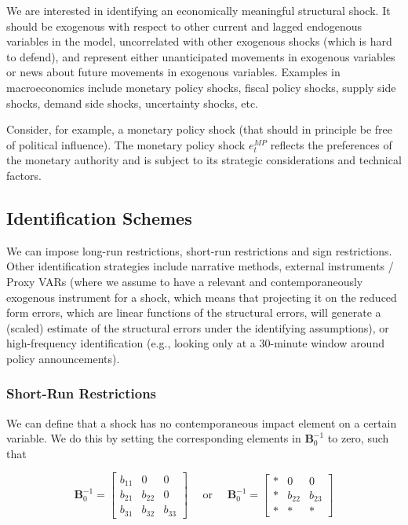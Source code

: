 We are interested in identifying an economically meaningful structural shock. It should be exogenous with respect to other current and lagged endogenous variables in the model, uncorrelated with other exogenous shocks (which is hard to defend), and represent either unanticipated movements in exogenous variables or news about future movements in exogenous variables. Examples in macroeconomics include monetary policy shocks, fiscal policy shocks, supply side shocks, demand side shocks, uncertainty shocks, etc. 

Consider, for example, a monetary policy shock (that should in principle be free of political influence). The monetary policy shock $e_t^{MP}$ reflects the preferences of the monetary authority and is subject to its strategic considerations and technical factors.

\subsection{Identification Schemes}

We can impose long-run restrictions, short-run restrictions and sign restrictions. Other identification strategies include narrative methods, external instruments / Proxy VARs (where we assume to have a relevant and contemporaneously exogenous instrument for a shock, which means that projecting it on the reduced form errors, which are linear functions of the structural errors, will generate a (scaled) estimate of the structural errors under the identifying assumptions), or high-frequency identification (e.g., looking only at a 30-minute window around policy announcements).

\subsubsection{Short-Run Restrictions}

We can define that a shock has no contemporaneous impact element on a certain variable. We do this by setting the corresponding elements in $\bm{B}_0^{-1}$ to zero, such that

\[
	\bm{B}_0^{-1}
	=
	\begin{bmatrix}
		b_{11} & 0 & 0 \\
		b_{21} & b_{22} & 0 \\
		b_{31} & b_{32} & b_{33}
	\end{bmatrix}
	\quad 
	\text{ or }
	\quad
	\bm{B}_0^{-1}
	=
	\begin{bmatrix}
		* & 0 & 0 \\
		* & b_{22} & b_{23} \\
		* & * & *
	\end{bmatrix}
\]

